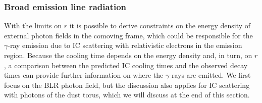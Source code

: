 \documentclass[twocolumn]{aastex62}
\newcommand{\Grays}{$\gamma$-rays\xspace}
\newcommand{\gray}{$\gamma$-ray\xspace}
\begin{document}
\subsubsection{Broad emission line radiation}
With the limits on $r$ it is possible to derive constraints on the energy density of external photon fields in the comoving frame, which could be responsible for the \gray emission due to IC scattering with relativistic electrons in the emission region. 
Because the cooling time depends on the energy density and, in turn, on $r$, a comparison between the predicted IC cooling times and the observed decay times can provide further information on where the \Grays are emitted.
We first focus on the BLR photon field, but the discussion also applies for IC scattering with photons of the dust torus, which we will discuss at the end of this section.
\end{document}
